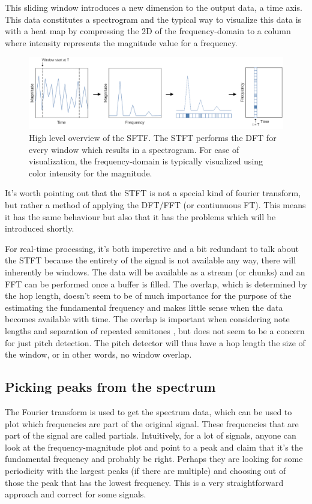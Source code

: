 This sliding window introduces a new dimension to the output data, a time axis. This data constitutes a spectrogram and the typical way to visualize this data is with a heat map by compressing the 2D of the frequency-domain to a column where intensity represents the magnitude value for a frequency. 

\begin{figure}[ht]
    \centering
    \includegraphics[width=\textwidth]{./images/stft.png}
    \caption{High level overview of the SFTF. The STFT performs the DFT for every window which results in a spectrogram. For ease of visualization, the frequency-domain is typically visualized using color intensity for the magnitude. \label{fig:stft}}
\end{figure}

It's worth pointing out that the STFT is not a special kind of fourier transform, but rather a method of applying the DFT/FFT (or contiunuous FT). This means it has the same behaviour but also that it has the problems which will be introduced shortly. 

For real-time processing, it's both imperetive and a bit redundant to talk about the STFT because the entirety of the signal is not available any way, there will inherently be windows. The data will be available as a stream (or chunks) and an FFT can be performed once a buffer is filled. The overlap, which is determined by the hop length, doesn't seem to be of much importance for the purpose of the estimating the fundamental frequency and makes little sense when the data becomes available with time. The overlap is important when considering note lengths and separation of repeated semitones , but does not seem to be a concern for just pitch detection. The pitch detector will thus have a hop length the size of the window, or in other words, no window overlap.

\subsection{Picking peaks from the spectrum}
The Fourier transform is used to get the spectrum data, which can be used to plot which frequencies are part of the original signal. These frequencies that are part of the signal are called partials. Intuitively, for a lot of signals, anyone can look at the frequency-magnitude plot and point to a peak and claim that it's the fundamental frequency and probably be right. Perhaps they are looking for some periodicity with the largest peaks (if there are multiple) and choosing out of those the peak that has the lowest frequency. This is a very straightforward approach and correct for some signals. 

